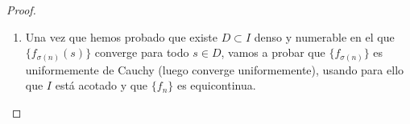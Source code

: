 \begin{teo}
\begin{proof}
\begin{enumerate}
                Hemos obtenido:
                \begin{equation*}
                    \begin{array}{cccccl}
                    f_{\sigma_0(0)} & f_{\sigma_0(1)} & \ldots & f_{\sigma_0(n)} & \ldots & \text{convergente en\ } t_0 \\
                f_{\sigma_1(0)} & f_{\sigma_1(1)} & \ldots & f_{\sigma_1(n)} & \ldots & \text{convergente en\ } t_0,t_1\\
                \vdots & \vdots & \ldots & \vdots & \ddots & \\
                        f_{\sigma_n(0)} & f_{\sigma_n(1)} & \ldots & f_{\sigma_n(n)} & \ldots  & \text{convergente en\ } t_0,t_1,\ldots,t_n
                    \end{array}
                \end{equation*}
                Y si tomamos ahora la sucesión que obtenemos observando la diagonal de la ``matriz'' superior, podemos considerar ahora la sucesión $\{f_{\sigma_n(n)}\}$, tenemos que es una parcial de $\{f_n\}$, puesto que la aplicación $\sigma:\mathbb{N}\to \mathbb{N}$ dada por:
                \begin{equation*}
                    \sigma(n) = \sigma_n(n)
                \end{equation*}
                es estrictamente creciente, puesto que para $m\in \mathbb{N}$ tenemos que:
                \begin{equation*}
                    \sigma(m+1) = \sigma_{m+1}(m+1) \geq \sigma_{m+1}(m) \geq \sigma_m(m) = \sigma(m)
                \end{equation*}
                Con $\{f_{\sigma(n)}\}_{n\geq m}$ parcial de $\{f_{\sigma_m(n)}\}_{n\geq m}$ para cada $m\in \mathbb{N}$, con lo que es convergente en todo punto de $D$.
            \item Una vez que hemos probado que existe $D\subset I$ denso y numerable en el que $\{f_{\sigma(n)}(s)\}$ converge para todo $s\in D$, vamos a probar que $\{f_{\sigma(n)}\}$ es uniformemente de Cauchy (luego converge uniformemente), usando para ello que $I$ está acotado y que $\{f_n\}$ es equicontinua.


\end{enumerate}
\end{proof}
\end{teo}

